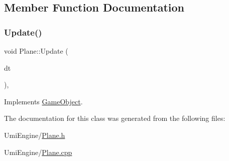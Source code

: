 \subsection{Member Function Documentation}
\mbox{\label{class_plane_af1ed004221fa7b42136789cb2c48b124}} 
\subsubsection{\texorpdfstring{Update()}{Update()}}
{\footnotesize\ttfamily void Plane\+::\+Update (\begin{DoxyParamCaption}\item[{G\+Lfloat}]{dt }\end{DoxyParamCaption})\hspace{0.3cm}{\ttfamily [override]}, {\ttfamily [virtual]}}



Implements \mbox{\hyperlink{class_game_object_aa100c768006aca3e7cdbabe27b48b9e5}{Game\+Object}}.



The documentation for this class was generated from the following files\+:\begin{DoxyCompactItemize}
\item 
Umi\+Engine/\mbox{\hyperlink{_plane_8h}{Plane.\+h}}\item 
Umi\+Engine/\mbox{\hyperlink{_plane_8cpp}{Plane.\+cpp}}\end{DoxyCompactItemize}
